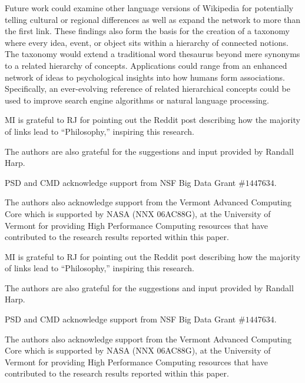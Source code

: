 \documentclass[pre,twocolumn,twoside,byrevtex,superscriptaddress,floatfix]{revtex4-1}
\begin{document}
Future work could examine other language versions of Wikipedia for potentially telling cultural or regional differences as well as expand the network to more than the first link.
These findings also form the basis for the creation of a taxonomy where 
every idea, event, or object sits within a hierarchy of connected notions.
The taxonomy would extend a traditional word thesaurus beyond mere synonyms to a related hierarchy of concepts.
Applications could range from an enhanced network of ideas to psychological insights into how humans form associations.
Specifically, an ever-evolving reference of related hierarchical concepts could be 
used to improve search engine algorithms or natural language processing.

\acknowledgments
MI is grateful to RJ for pointing out the Reddit post 
\cite{reddit}
describing how the majority of links lead to ``Philosophy,'' inspiring this research.

The authors are also grateful for the suggestions and input provided by Randall Harp.

PSD and CMD acknowledge support from NSF Big Data Grant $\#1447634$.

The authors also acknowledge support from the Vermont Advanced Computing Core which is supported by NASA (NNX 06AC88G), at the University of Vermont for providing High Performance Computing resources that have contributed to the research results reported within this paper.

\newpage

\acknowledgments
MI is grateful to RJ for pointing out the Reddit post 
\cite{reddit}
describing how the majority of links lead to ``Philosophy,'' inspiring this research.

The authors are also grateful for the suggestions and input provided by Randall Harp.

PSD and CMD acknowledge support from NSF Big Data Grant $\#1447634$.

The authors also acknowledge support from the Vermont Advanced Computing Core which is supported by NASA (NNX 06AC88G), at the University of Vermont for providing High Performance Computing resources that have contributed to the research results reported within this paper.
\end{document}
